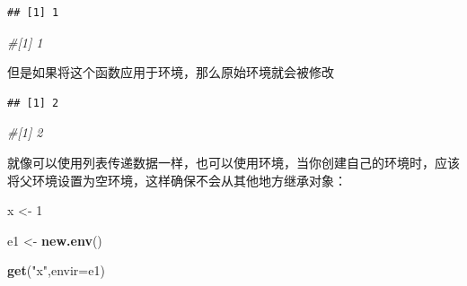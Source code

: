 \documentclass[]{book}
\newenvironment{Shaded}{\begin{snugshade}}{\end{snugshade}}
\newcommand{\KeywordTok}[1]{\textcolor[rgb]{0.13,0.29,0.53}{\textbf{#1}}}
\newcommand{\DataTypeTok}[1]{\textcolor[rgb]{0.13,0.29,0.53}{#1}}
\newcommand{\DecValTok}[1]{\textcolor[rgb]{0.00,0.00,0.81}{#1}}
\newcommand{\StringTok}[1]{\textcolor[rgb]{0.31,0.60,0.02}{#1}}
\newcommand{\CommentTok}[1]{\textcolor[rgb]{0.56,0.35,0.01}{\textit{#1}}}
\newcommand{\OperatorTok}[1]{\textcolor[rgb]{0.81,0.36,0.00}{\textbf{#1}}}
\newcommand{\NormalTok}[1]{#1}
\begin{document}
\begin{Shaded}
\end{Shaded}

\begin{verbatim}
## [1] 1
\end{verbatim}

\begin{Shaded}
\begin{Highlighting}[]
\CommentTok{#[1] 1}
\end{Highlighting}
\end{Shaded}

但是如果将这个函数应用于环境，那么原始环境就会被修改

\begin{Shaded}
\end{Shaded}

\begin{verbatim}
## [1] 2
\end{verbatim}

\begin{Shaded}
\begin{Highlighting}[]
\CommentTok{#[1] 2}
\end{Highlighting}
\end{Shaded}

就像可以使用列表传递数据一样，也可以使用环境，当你创建自己的环境时，应该将父环境设置为空环境，这样确保不会从其他地方继承对象：

\begin{Shaded}
\begin{Highlighting}[]
\NormalTok{x <-}\StringTok{ }\DecValTok{1}

\NormalTok{e1 <-}\StringTok{ }\KeywordTok{new.env}\NormalTok{()}

\KeywordTok{get}\NormalTok{(}\StringTok{"x"}\NormalTok{,}\DataTypeTok{envir=}\NormalTok{e1)}
\end{Highlighting}
\end{Shaded}
\end{document}
